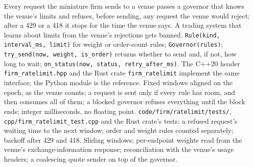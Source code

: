\begin{build}
 Every request the miniature firm sends to a venue passes a governor that knows the venue's
limits and refuses, before sending, any request the venue would reject; after a 429 or a 418 it stops for
the time the venue says. A trading system that learns about limits from the venue's rejections gets banned.
 \texttt{Rule(kind, interval\_ms, limit)} for weight or order-count rules;
\texttt{Governor(rules)}; \texttt{try\_send(now, weight, is\_order)} returns whether to send and, if not, how
long to wait; \texttt{on\_status(now, status, retry\_after\_ms)}. The C++20 header \texttt{firm\_ratelimit.hpp}
and the Rust crate \texttt{firm\_ratelimit} implement the same interface; the Python module is the reference.
 Fixed windows aligned on the epoch, as the venue counts; a request is sent only if every rule
has room, and then consumes all of them; a blocked governor refuses everything until the block ends; integer
milliseconds, no floating point.
 \texttt{code/firm/ratelimit/tests/}, \texttt{cpp/firm\_ratelimit\_test.cpp} and the
Rust crate's tests: a refused request's waiting time to the next window; order and weight rules counted
separately; backoff after 429 and 418.
 Sliding windows; per-endpoint weights read from the venue's exchange-information response;
reconciliation with the venue's usage headers; a coalescing quote sender on top of the governor.
\end{build}

\label{lst:m3:centralised-exchanges:governor}

